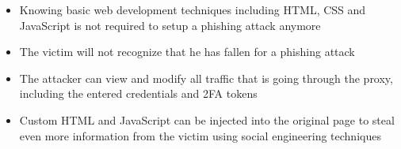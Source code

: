 \documentclass[12pt]{report}
\begin{document}
\begin{itemize}
 \item Knowing basic web development techniques including HTML, CSS and JavaScript
       is not required to setup a phishing attack anymore

  \item The victim will not recognize that he has fallen for a phishing attack

  \item The attacker can view and modify all traffic that is going through the proxy,
    including the entered credentials and 2FA tokens

  \item Custom HTML and JavaScript can be injected into the original page to steal even more
    information from the victim using social engineering techniques
\end{itemize}
\end{document}
